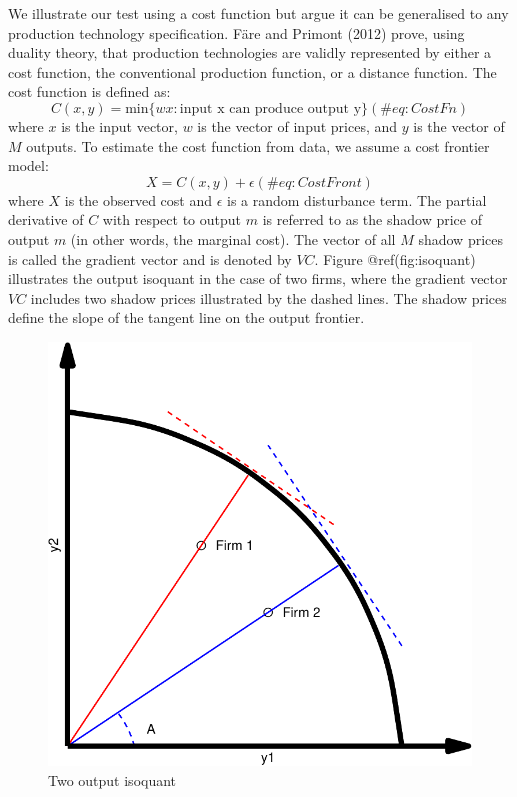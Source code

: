 \documentclass[
  10pt,
]{article}
\begin{document}
We illustrate our test using a cost function but argue it can be
generalised to any production technology specification. Färe and Primont
(2012) prove, using duality theory, that production technologies are
validly represented by either a cost function, the conventional
production function, or a distance function. The cost function is
defined as: \begin{equation}
C(x,y)=\text{min} \{wx:\text{input x can produce output y}\}
(\#eq:CostFn)
\end{equation} where \(x\) is the input vector, \(w\) is the vector of
input prices, and \(y\) is the vector of \(M\) outputs. To estimate the
cost function from data, we assume a cost frontier model:
\begin{equation}
X=C(x,y) + \epsilon
(\#eq:CostFront)
\end{equation} where \(X\) is the observed cost and \(\epsilon\) is a
random disturbance term. The partial derivative of \(C\) with respect to
output \(m\) is referred to as the shadow price of output \(m\) (in
other words, the marginal cost). The vector of all \(M\) shadow prices
is called the gradient vector and is denoted by \(VC\). Figure
@ref(fig:isoquant) illustrates the output isoquant in the case of two
firms, where the gradient vector \(VC\) includes two shadow prices
illustrated by the dashed lines. The shadow prices define the slope of
the tangent line on the output frontier.

\begin{figure}[H]
\includegraphics{figures/paper-isoquant-1} \caption{ Two output isoquant}\label{fig:isoquant}
\end{figure}
\end{document}
